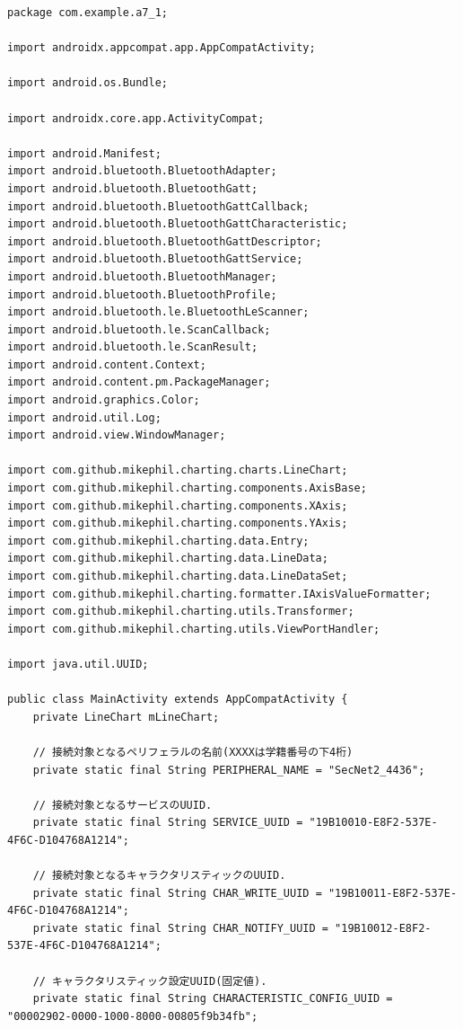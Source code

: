 \documentclass[dvipdfmx,autodetect-engine,titlepage]{jsarticle}
\begin{document}
  \begin{lstlisting}[caption=Java.py,label=Java]
    package com.example.a7_1;

import androidx.appcompat.app.AppCompatActivity;

import android.os.Bundle;

import androidx.core.app.ActivityCompat;

import android.Manifest;
import android.bluetooth.BluetoothAdapter;
import android.bluetooth.BluetoothGatt;
import android.bluetooth.BluetoothGattCallback;
import android.bluetooth.BluetoothGattCharacteristic;
import android.bluetooth.BluetoothGattDescriptor;
import android.bluetooth.BluetoothGattService;
import android.bluetooth.BluetoothManager;
import android.bluetooth.BluetoothProfile;
import android.bluetooth.le.BluetoothLeScanner;
import android.bluetooth.le.ScanCallback;
import android.bluetooth.le.ScanResult;
import android.content.Context;
import android.content.pm.PackageManager;
import android.graphics.Color;
import android.util.Log;
import android.view.WindowManager;

import com.github.mikephil.charting.charts.LineChart;
import com.github.mikephil.charting.components.AxisBase;
import com.github.mikephil.charting.components.XAxis;
import com.github.mikephil.charting.components.YAxis;
import com.github.mikephil.charting.data.Entry;
import com.github.mikephil.charting.data.LineData;
import com.github.mikephil.charting.data.LineDataSet;
import com.github.mikephil.charting.formatter.IAxisValueFormatter;
import com.github.mikephil.charting.utils.Transformer;
import com.github.mikephil.charting.utils.ViewPortHandler;

import java.util.UUID;

public class MainActivity extends AppCompatActivity {
    private LineChart mLineChart;

    // 接続対象となるペリフェラルの名前(XXXXは学籍番号の下4桁)
    private static final String PERIPHERAL_NAME = "SecNet2_4436";

    // 接続対象となるサービスのUUID.
    private static final String SERVICE_UUID = "19B10010-E8F2-537E-4F6C-D104768A1214";

    // 接続対象となるキャラクタリスティックのUUID.
    private static final String CHAR_WRITE_UUID = "19B10011-E8F2-537E-4F6C-D104768A1214";
    private static final String CHAR_NOTIFY_UUID = "19B10012-E8F2-537E-4F6C-D104768A1214";

    // キャラクタリスティック設定UUID(固定値).
    private static final String CHARACTERISTIC_CONFIG_UUID = "00002902-0000-1000-8000-00805f9b34fb";


\end{lstlisting}
\end{document}

